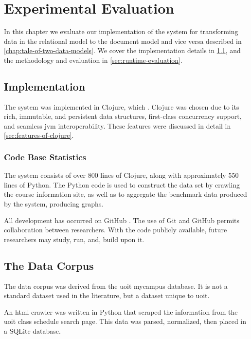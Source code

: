 \chapter{Experimental Evaluation}
\label{chap:experimental-evaluation}
	In this chapter we evaluate our implementation of the system for transforming data in the relational model to the document model and vice versa described in \cref{chap:tale-of-two-data-models}.  We cover the implementation details in \cref{sec:implementation}, and the methodology and evaluation in \cref{sec:runtime-evaluation}.
	
	\section{Implementation}
	\label{sec:implementation}
		The system was implemented in Clojure, which .  Clojure was chosen due to its rich, immutable, and persistent data structures, first-class concurrency support, and seamless \gls{jvm} interoperability.  These features were discussed in detail in \cref{sec:features-of-clojure}.
		
		\subsection{Code Base Statistics}
			The system consists of over 800 lines of Clojure, along with approximately 550 lines of Python.  The Python code is used to construct the data set by crawling the course information site, as well as to aggregate the benchmark data produced by the system, producing graphs.
			
			All development has occurred on GitHub \cite{molly-repo}.  The use of Git and GitHub permits collaboration between researchers.  With the code publicly available, future researchers may study, run, and, build upon it.
	
	\section{The Data Corpus}
	\label{sec:data-corpus}
		The data corpus was derived from the \gls{uoit} mycampus database.  It is not a standard dataset used in the literature, but a dataset unique to \gls{uoit}.
		
		An \gls{html} crawler was written in Python that scraped the information from the \gls{uoit} class schedule search page.  This data was parsed, normalized, then placed in a SQLite database.
		
